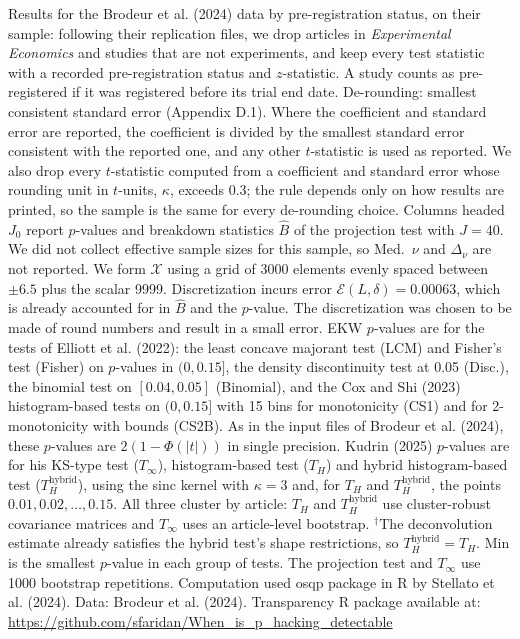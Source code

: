 \begin{table}[htbp]
\medskip
\begin{minipage}{\linewidth}
Results for the Brodeur et al. (2024) data by pre-registration status, on their sample: following their replication files, we drop articles in \textit{Experimental Economics} and studies that are not experiments, and keep every test statistic with a recorded pre-registration status and $z$-statistic.
A study counts as pre-registered if it was registered before its trial end date.
De-rounding: smallest consistent standard error (Appendix D.1). Where the coefficient and standard error are reported, the coefficient is divided by the smallest standard error consistent with the reported one, and any other $t$-statistic is used as reported.
We also drop every $t$-statistic computed from a coefficient and standard error whose rounding unit in $t$-units, $\kappa$, exceeds 0.3; the rule depends only on how results are printed, so the sample is the same for every de-rounding choice.
Columns headed $J_0$ report $p$-values and breakdown statistics $\widehat{B}$ of the projection test with $J=40$.
We did not collect effective sample sizes for this sample, so Med.\ $\nu$ and $\Delta_\nu$ are not reported.
We form $\mathcal{X}$ using a grid of 3000 elements evenly spaced between $\pm 6.5$ plus the scalar 9999.
Discretization incurs error $\mathcal{E}(L,\delta)=0.00063$, which is already accounted for in $\widehat{B}$ and the $p$-value.
The discretization was chosen to be made of round numbers and result in a small error.
EKW $p$-values are for the tests of Elliott et al. (2022): the least concave majorant test (LCM) and Fisher's test (Fisher) on $p$-values in $(0,0.15]$, the density discontinuity test at 0.05 (Disc.), the binomial test on $[0.04,0.05]$ (Binomial), and the Cox and Shi (2023) histogram-based tests on $(0,0.15]$ with 15 bins for monotonicity (CS1) and for 2-monotonicity with bounds (CS2B).
As in the input files of Brodeur et al. (2024), these $p$-values are $2(1-\Phi(|t|))$ in single precision.
Kudrin (2025) $p$-values are for his KS-type test ($T_\infty$), histogram-based test ($T_H$) and hybrid histogram-based test ($T_H^{\mathrm{hybrid}}$), using the sinc kernel with $\kappa=3$ and, for $T_H$ and $T_H^{\mathrm{hybrid}}$, the points $0.01,0.02,\ldots,0.15$.
All three cluster by article: $T_H$ and $T_H^{\mathrm{hybrid}}$ use cluster-robust covariance matrices and $T_\infty$ uses an article-level bootstrap.
$^\dagger$The deconvolution estimate already satisfies the hybrid test's shape restrictions, so $T_H^{\mathrm{hybrid}}=T_H$.
Min is the smallest $p$-value in each group of tests.
The projection test and $T_\infty$ use 1000 bootstrap repetitions.
Computation used osqp package in R by Stellato et al. (2024). Data: Brodeur et al. (2024).
Transparency R package available at: \url{https://github.com/sfaridan/When_is_p_hacking_detectable}
\end{minipage}
\end{table}
